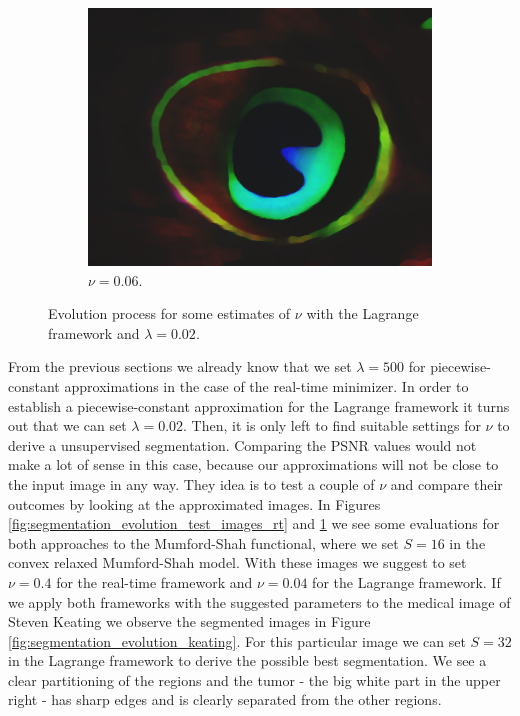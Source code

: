 \documentclass[abstracton]{scrreprt}
\begin{document}
\begin{figure}[!ht]
\begin{subfigure}[b]{0.16\textwidth}
                    \includegraphics[width=\textwidth]{img/segmentation/cr/006peacock-feather.png}
                    \caption{$\nu = 0.06$.}
                \end{subfigure}
                \caption[Evolution process for image segmentation with Lagrange Mumford-Shah.]{Evolution process for some estimates of $\nu$ with the Lagrange framework and $\lambda = 0.02$.}
            \label{fig:segmentation_evolution_test_images_cr}
            \end{figure}
            From the previous sections we already know that we set $\lambda = 500$ for piecewise-constant approximations in the case of the real-time minimizer. In order to establish a piecewise-constant approximation for the Lagrange framework it turns out that we can set $\lambda = 0.02$. Then, it is only left to find suitable settings for $\nu$ to derive a unsupervised segmentation. Comparing the PSNR values would not make a lot of sense in this case, because our approximations will not be close to the input image in any way. They idea is to test a couple of $\nu$ and compare their outcomes by looking at the approximated images. In Figures \ref{fig:segmentation_evolution_test_images_rt} and \ref{fig:segmentation_evolution_test_images_cr} we see some evaluations for both approaches to the Mumford-Shah functional, where we set $S = 16$ in the convex relaxed Mumford-Shah model. With these images we suggest to set $\nu = 0.4$ for the real-time framework and $\nu = 0.04$ for the Lagrange framework. If we apply both frameworks with the suggested parameters to the medical image of Steven Keating we observe the segmented images in Figure \ref{fig:segmentation_evolution_keating}. For this particular image we can set $S = 32$ in the Lagrange framework to derive the possible best segmentation. We see a clear partitioning of the regions and the tumor - the big white part in the upper right - has sharp edges and is clearly separated from the other regions.\\\\
\end{document}
